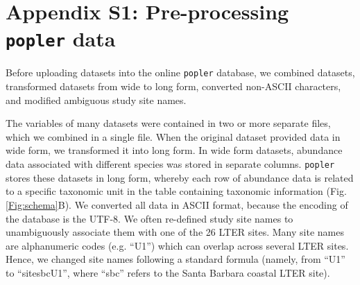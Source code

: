 \documentclass{article}\usepackage[]{graphicx}\usepackage[]{color}
\begin{document}



\newpage

\section*{Appendix S1: Pre-processing \texttt{popler} data}
Before uploading datasets into the online \texttt{popler} database, we combined datasets, transformed datasets from wide to long form, converted non-ASCII characters, and modified ambiguous study site names.

The variables of many datasets were contained in two or more separate files, which we combined in a single file. When the original dataset provided data in wide form, we transformed it into long form. In wide form datasets, abundance data associated with different species was stored in separate columns. \texttt{popler} stores these datasets in long form, whereby each row of abundance data is related to a specific taxonomic unit in the table containing taxonomic information (Fig. \ref{Fig:schema}B). We converted all data in ASCII format, because the encoding of the database is the UTF-8. We often re-defined study site names to unambiguously associate them with one of the 26 LTER sites. Many site names are alphanumeric codes (e.g. ``U1'') which can overlap across several LTER sites. Hence, we changed site names following a standard formula (namely, from ``U1'' to ``site\textunderscore sbc\textunderscore U1'', where ``sbc'' refers to the Santa Barbara coastal LTER site).
\end{document}
